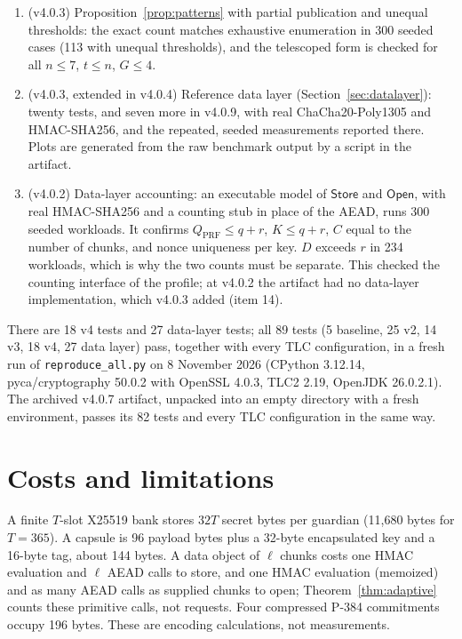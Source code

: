 \documentclass[pdflatex,sn-mathphys-num,twocolumn]{sn-jnl}
\theoremstyle{plain}
\theoremstyle{definition}
\newcommand{\code}[1]{\texttt{#1}}
\begin{document}
\begin{enumerate}
\item (v4.0.3) Proposition~\ref{prop:patterns} with partial publication and unequal thresholds: the exact count matches exhaustive enumeration in 300 seeded cases (113 with unequal thresholds), and the telescoped form is checked for all $n\le7$, $t\le n$, $G\le4$.
\item (v4.0.3, extended in v4.0.4) Reference data layer (Section~\ref{sec:datalayer}): twenty tests, and seven more in v4.0.9, with real ChaCha20-Poly1305 and HMAC-SHA256, and the repeated, seeded measurements reported there. Plots are generated from the raw benchmark output by a script in the artifact.
\item (v4.0.2) Data-layer accounting: an executable model of $\mathsf{Store}$ and $\mathsf{Open}$, with real HMAC-SHA256 and a counting stub in place of the AEAD, runs 300 seeded workloads. It confirms $Q_{\mathrm{PRF}}\le q+r$, $K\le q+r$, $C$ equal to the number of chunks, and nonce uniqueness per key. $D$ exceeds $r$ in 234 workloads, which is why the two counts must be separate. This checked the counting interface of the profile; at v4.0.2 the artifact had no data-layer implementation, which v4.0.3 added (item 14).
\end{enumerate}
There are 18 v4 tests and 27 data-layer tests; all 89 tests (5 baseline, 25 v2, 14 v3, 18 v4, 27 data layer) pass, together with every TLC configuration, in a fresh run of \code{reproduce\_all.py} on 8 November 2026 (CPython 3.12.14, pyca/cryptography 50.0.2 with OpenSSL 4.0.3, TLC2 2.19, OpenJDK 26.0.2.1). The archived v4.0.7 artifact, unpacked into an empty directory with a fresh environment, passes its 82 tests and every TLC configuration in the same way.


\section{Costs and limitations}\label{sec:limits}

A finite $T$-slot X25519 bank stores $32T$ secret bytes per guardian (11,680 bytes for $T=365$). A capsule is 96 payload bytes plus a 32-byte encapsulated key and a 16-byte tag, about 144 bytes. A data object of $\ell$ chunks costs one HMAC evaluation and $\ell$ AEAD calls to store, and one HMAC evaluation (memoized) and as many AEAD calls as supplied chunks to open; Theorem~\ref{thm:adaptive} counts these primitive calls, not requests. Four compressed P-384 commitments occupy 196 bytes. These are encoding calculations, not measurements.
\end{document}
